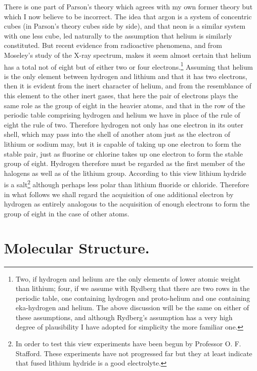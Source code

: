 \documentclass[11pt]{memoir}
\begin{document}
There is one part of Parson's theory which agrees with my own former theory but which I now believe to be incorrect.  The idea that argon is a system of concentric cubes (in Parson's theory cubes side by side), and that neon is a similar system with one less cube, led naturally to the assumption that helium is similarly constituted.  But recent evidence from radioactive phenomena, and from Moseley's study of the X-ray spectrum, makes it seem almost certain that helium has a total not of eight but of either two or four electrons.\footnote{Two, if hydrogen and helium are the only elements of lower atomic weight than lithium; four, if we assume with Rydberg that there are two rows in the periodic table, one containing hydrogen and proto-helium and one containing eka-hydrogen and helium.  The above discussion will be the same on either of these assumptions, and although Rydberg's assumption has a very high degree of plausibility I have adopted for simplicity the more familiar one.}  Assuming that helium is the only element between hydrogen and lithium and that it has two electrons, then it is evident from the inert character of helium, and from the resemblance of this element to the other inert gases, that here the pair of electrons plays the same role as the group of eight in the heavier atoms, and that in the row of the periodic table comprising hydrogen and helium we have in place of the rule of eight the rule of two.  Therefore hydrogen not only has one electron in its outer shell, which may pass into the shell of another atom just as the electron of lithium or sodium may, but it is capable of taking up one electron to form the stable pair, just as fluorine or chlorine takes up one electron to form the stable group of eight.  Hydrogen therefore must be regarded as the first member of the halogens as well as of the lithium group.  According to this view lithium hydride is a salt\footnote{In order to test this view experiments have been begun by Professor O. F. Stafford.  These experiments have not progressed far but they at least indicate that fused lithium hydride is a good electrolyte.} although perhaps less polar than lithium fluoride or chloride.  Therefore in what follows we shall regard the acquisition of one additional electron by hydrogen as entirely analogous to the acquisition of enough electrons to form the group of eight in the case of other atoms.

\section*{Molecular Structure.}
\end{document}
